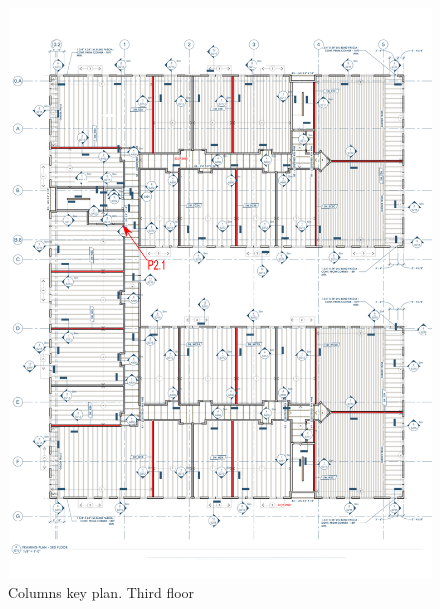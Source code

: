 \begin{figure}
  \begin{center}
  \includegraphics[width=120mm]{figures/columns/columns_key_plan_3rd_floor}
  \end{center}
  \caption{Columns key plan. Third floor}\label{fg_columns_key_plan_3rd_floor}
\end{figure}

